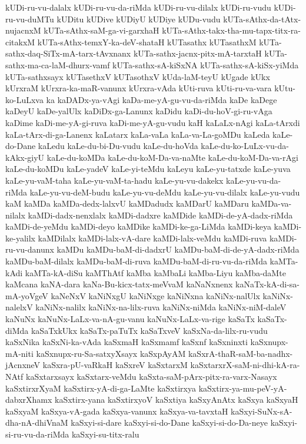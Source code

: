 {kUDi-ru-vu-dalalx
kUDi-ru-vu-da-riMda
kUDi-ru-vu-dilalx
kUDi-ru-vudu
kUDi-ru-vu-duMTu
kUDitu
kUDive
kUDiyU
kUDiye
kUDu-vudu
kUTa-sAthx-da-tAtx-nujacnxM
kUTa-sAthx-saM-ga-vi-garxhaH
kUTa-sAthx-takx-tha-mu-tapx-titx-ra-citakxM
kUTa-sAthx-temxY-ka-deV-shataH
kUTasathx
kUTasathxM
kUTa-sathx-daq-SiTx-mA-tarx-tAvxnanx
kUTa-sathx-jacnx-pitx-mA-tarxtaH
kUTa-sathx-ma-ca-laM-dhurx-vamf
kUTa-sathx-sA-kiSxNA
kUTa-sathx-sA-kiSx-yiMda
kUTa-sathxsayx
kUTasethxV
kUTasothxV
kUda-laM-teyU
kUgade
kUkx
kUrxraM
kUrxra-ka-maR-vanunx
kUrxra-vAda
kUti-ruva
kUti-ru-va-vara
kUtu-ko-LuLxva
ka
kaDADx-ya-vAgi
kaDa-me-yA-gu-vu-da-riMda
kaDe
kaDege
kaDeyU
kaDe-yalUlx
kaDiDx-ga-Lanunx
kaDidu
kaDi-du-hoV-gi-ru-vAga
kaDime
kaDi-me-yA-gi-ruva
kaDi-me-yA-gu-vudu
kaH
kaLaLx-nAgi
kaLa-tArxdi
kaLa-tArx-di-ga-Lanenx
kaLatarx
kaLa-vaLa
kaLa-va-La-goMDu
kaLeda
kaLe-do-Dane
kaLedu
kaLe-du-bi-Du-vudu
kaLe-du-hoVda
kaLe-du-ko-LuLx-vu-da-kAkx-giyU
kaLe-du-koMDa
kaLe-du-koM-Da-va-naMte
kaLe-du-koM-Da-va-rAgi
kaLe-du-koMDu
kaLe-yadeV
kaLe-yi-teMdu
kaLeyu
kaLe-yu-tatxde
kaLe-yuva
kaLe-yu-vaM-taha
kaLe-yu-vaM-ta-hadu
kaLe-yu-vu-dakekx
kaLe-yu-vu-da-riMda
kaLe-yu-vu-deM-budu
kaLe-yu-vu-deMdu
kaLe-yu-vu-dilalx
kaLe-yu-vudu
kaM
kaMDa
kaMDa-dedx-lalxvU
kaMDadudx
kaMDarU
kaMDaru
kaMDa-va-nilalx
kaMDi-dadx-nenxlalx
kaMDi-dadxre
kaMDide
kaMDi-de-yA-dadx-riMda
kaMDi-de-yeMdu
kaMDi-deyo
kaMDike
kaMDi-ke-ga-LiMda
kaMDi-keya
kaMDi-ke-yalilx
kaMDilalx
kaMDi-lalx-vA-dare
kaMDi-lalx-veMdu
kaMDi-ruva
kaMDi-ru-vu-danunx
kaMDu
kaMDu-baM-di-dadxrU
kaMDu-baM-di-de-yA-dadx-riMda
kaMDu-baM-dilalx
kaMDu-baM-di-ruva
kaMDu-baM-di-ru-vu-da-riMda
kaMTa-kAdi
kaMTa-kA-diSu
kaMThAtf
kaMba
kaMbaLi
kaMba-Liyu
kaMba-daMte
kaMcana
kaNA-dara
kaNa-Bu-kicx-tatx-meVvaM
kaNaNxnenx
kaNaTx-kA-di-sa-mA-yoVgeV
kaNeNxV
kaNiNxgU
kaNiNxge
kaNiNxna
kaNiNx-nalUlx
kaNiNx-nalelxV
kaNiNx-nalilx
kaNiNx-na-lilx-ruva
kaNiNx-niMda
kaNiNx-niM-daleV
kaNuNx
kaNuNx-LaLx-va-nA-gu-vanu
kaNuNx-LaLx-va-rige
kaSaTx
kaSaTx-diMda
kaSaTxkUkx
kaSaTx-paTuTx
kaSaTxveV
kaSxNa-da-lilx-ru-vudu
kaSxNika
kaSxNi-ka-vAda
kaSxmaH
kaSxmamf
kaSxnf
kaSxninxti
kaSxnupx-mA-niti
kaSxnupx-ru-Sa-satxyXsayx
kaSxpAyAM
kaSxrA-thaR-saM-ba-nadhx-jAcnxneV
kaSxra-pU-vaRkaH
kaSxreV
kaSxtarxM
kaSxtarxrX-saM-ni-dhi-kA-ra-NAtf
kaSxtarxsayx
kaSxtarx-veMdu
kaSxta-saM-pArx-pitx-ra-varx-Nasayx
kaSxtirxrXyaM
kaSxtirx-yA-di-ga-LaMte
kaSxtirxya
kaSxtirx-ya-mu-peV-yA-dabxrXhamx
kaSxtirx-yana
kaSxtirxyoV
kaSxtiya
kaSxyAnAtx
kaSxya
kaSxyaH
kaSxyaM
kaSxya-vA-gada
kaSxya-vanunx
kaSxya-va-tavxtaH
kaSxyi-SuNx-sA-dha-nA-dhiVnaM
kaSxyi-si-dare
kaSxyi-si-do-Dane
kaSxyi-si-do-Da-neye
kaSxyi-si-ru-vu-da-riMda
kaSxyi-su-titx-ralu
}
